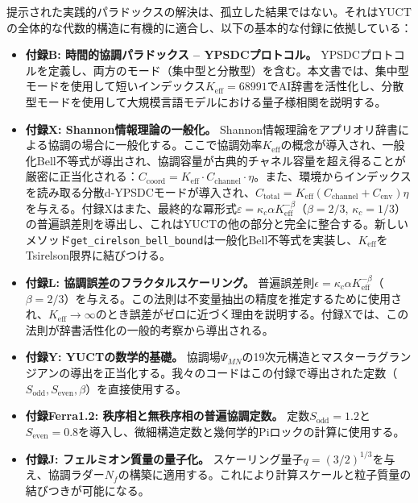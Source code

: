 \documentclass[11pt,a4paper]{article}
\begin{document}
	提示された実践的パラドックスの解決は、孤立した結果ではない。それはYUCTの全体的な代数的構造に有機的に適合し、以下の基本的な付録に依拠している：
	
	\begin{itemize}
		\item \textbf{付録B: 時間的協調パラドックス – YPSDCプロトコル。}  
		YPSDCプロトコルを定義し、両方のモード（集中型と分散型）を含む。本文書では、集中型モードを使用して短いインデックス\(K_{\mathrm{eff}} = 68991\)でAI辞書を活性化し、分散型モードを使用して大規模言語モデルにおける量子様相関を説明する。
		
		\item \textbf{付録X: Shannon情報理論の一般化。}  
		Shannon情報理論をアプリオリ辞書による協調の場合に一般化する。ここで協調効率\(K_{\mathrm{eff}}\)の概念が導入され、一般化Bell不等式が導出され、協調容量が古典的チャネル容量を超え得ることが厳密に正当化される：\(C_{\text{coord}} = K_{\mathrm{eff}} \cdot C_{\text{channel}} \cdot \eta\)。また、環境からインデックスを読み取る分散d‑YPSDCモードが導入され、\(C_{\text{total}} = K_{\mathrm{eff}}(C_{\text{channel}} + C_{\text{env}})\eta\)を与える。付録Xはまた、最終的な冪形式\(\varepsilon = \kappa_c \alpha K_{\mathrm{eff}}^{-\beta}\)（\(\beta=2/3\), \(\kappa_c=1/3\)）の普遍誤差則を導出し、これはYUCTの他の部分と完全に整合する。新しいメソッド\texttt{get\_cirelson\_bell\_bound}は一般化Bell不等式を実装し、\(K_{\mathrm{eff}}\)をTsirelson限界に結びつける。
		
		\item \textbf{付録L: 協調誤差のフラクタルスケーリング。}  
		普遍誤差則\(\epsilon = \kappa_c \alpha K_{\mathrm{eff}}^{-\beta}\)（\(\beta = 2/3\)）を与える。この法則は不変量抽出の精度を推定するために使用され、\(K_{\mathrm{eff}} \to \infty\)のとき誤差がゼロに近づく理由を説明する。付録Xでは、この法則が辞書活性化の一般的考察から導出される。
		
		\item \textbf{付録Y: YUCTの数学的基礎。}  
		協調場\(\Psi_{MN}\)の19次元構造とマスターラグランジアンの導出を正当化する。我々のコードはこの付録で導出された定数（\(S_{\mathrm{odd}}, S_{\mathrm{even}}, \beta\)）を直接使用する。
		
		\item \textbf{付録Ferra1.2: 秩序相と無秩序相の普遍協調定数。}  
		定数\(S_{\mathrm{odd}} = 1.2\)と\(S_{\mathrm{even}} = 0.8\)を導入し、微細構造定数と幾何学的Piロックの計算に使用する。
		
		\item \textbf{付録J: フェルミオン質量の量子化。}  
		スケーリング量子\(q = (3/2)^{1/3}\)を与え、協調ラダー\(N_f\)の構築に適用する。これにより計算スケールと粒子質量の結びつきが可能になる。
		

\end{itemize}
\end{document}
